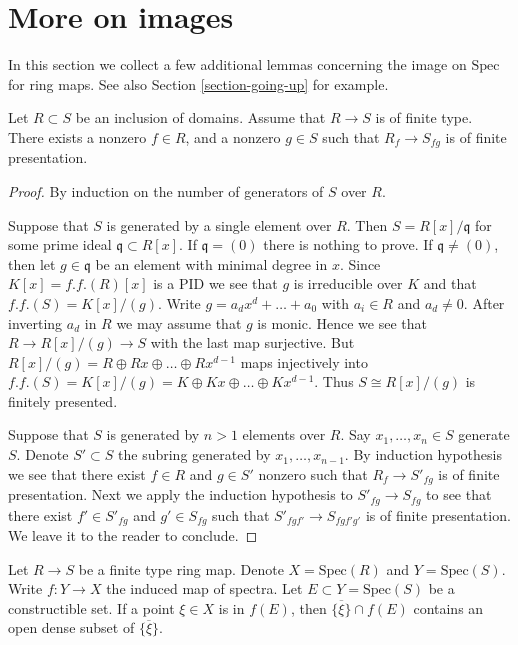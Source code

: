 \section{More on images}
\label{section-more-images}

\noindent
In this section we collect a few additional lemmas concerning the image
on $\text{Spec}$ for ring maps. See also Section \ref{section-going-up}
for example.

\begin{lemma}
\label{lemma-generic-finite-presentation}
Let $R \subset S$ be an inclusion of domains.
Assume that $R \to S$ is of finite type.
There exists a nonzero $f \in R$, and a nonzero $g \in S$
such that $R_f \to S_{fg}$ is of finite presentation.
\end{lemma}

\begin{proof}
By induction on the number of generators of
$S$ over $R$.

\medskip\noindent
Suppose that $S$ is generated by a single element
over $R$. Then $S = R[x]/\mathfrak q$ for some
prime ideal $\mathfrak q \subset R[x]$. If $\mathfrak q = (0)$
there is nothing to prove. If $\mathfrak q \not = (0)$,
then let $g \in \mathfrak q$ be an element with minimal
degree in $x$. Since $K[x] = f.f.(R)[x]$ is a PID we see that
$g$ is irreducible over $K$ and that $f.f.(S) = K[x]/(g)$.
Write $g = a_d x^d + \ldots + a_0$
with $a_i \in R$ and $a_d \not = 0$. After inverting $a_d$
in $R$ we may assume that $g$ is monic. Hence we see that
$R \to R[x]/(g) \to S$ with the last map surjective.
But $R[x]/(g) = R \oplus Rx \oplus \ldots \oplus Rx^{d-1}$
maps injectively into $f.f.(S) = K[x]/(g) = K \oplus Kx \oplus
\ldots \oplus Kx^{d-1}$. Thus $S \cong R[x]/(g)$ is finitely
presented.

\medskip\noindent
Suppose that $S$ is generated by $n > 1$ elements over $R$.
Say $x_1,\ldots,x_n \in S$ generate $S$. Denote $S' \subset S$
the subring generated by $x_1,\ldots,x_{n-1}$. By induction
hypothesis we see that there exist $f\in R$ and $g \in S'$
nonzero such that $R_f \to S'_{fg}$ is of finite presentation.
Next we apply the induction hypothesis to $S'_{fg} \to S_{fg}$
to see that there exist $f' \in S'_{fg}$ and
$g' \in S_{fg}$ such that $S'_{fgf'} \to S_{fgf'g'}$
is of finite presentation. We leave it to the reader to conclude.
\end{proof}

\begin{lemma}
\label{lemma-characterize-image-finite-type}
Let $R \to S$ be a finite type ring map.
Denote $X = \text{Spec}(R)$ and $Y = \text{Spec}(S)$.
Write $f : Y \to X$ the induced
map of spectra. Let $E \subset Y = \text{Spec}(S)$ be a
constructible set.
If a point $\xi \in X$ is in $f(E)$, then
$\overline{\{\xi\}} \cap f(E)$ contains an open
dense subset of $\overline{\{\xi\}}$.
\end{lemma}

